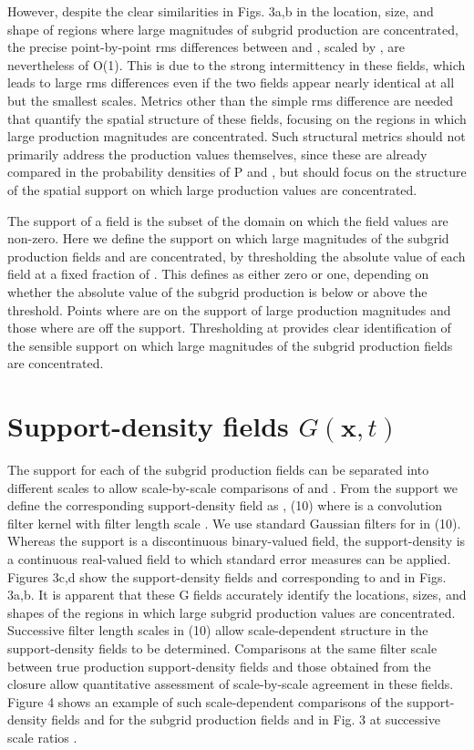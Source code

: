 However, despite the clear similarities in Figs. 3a,b in the location, size, and shape of regions where large magnitudes of subgrid production are concentrated, the precise point-by-point rms differences between   and  , scaled by  , are nevertheless of O(1). This is due to the strong intermittency in these fields, which leads to large rms differences even if the two fields appear nearly identical at all but the smallest scales. Metrics other than the simple rms difference are needed that quantify the spatial structure of these fields, focusing on the regions in which large production magnitudes are concentrated. Such structural metrics should not primarily address the production values themselves, since these are already compared in the probability densities of P and  , but should focus on the structure of the spatial support on which large production values are concentrated.  

The support of a field is the subset of the domain on which the field values are non-zero. Here we define the support on which large magnitudes of the subgrid production fields   and   are concentrated, by thresholding the absolute value of each field at a fixed fraction   of  . This defines   as either zero or one, depending on whether the absolute value of the subgrid production is below or above the threshold. Points where   are on the support of large production magnitudes and those where   are off the support. Thresholding   at   provides clear identification of the sensible support on which large magnitudes of the subgrid production fields are concentrated. 

\section{Support-density fields $G(\mathbf{x},t)$ }

The support for each of the subgrid production fields can be separated into different scales to allow scale-by-scale comparisons of   and  . From the support   we define the corresponding support-density field   as 
  ,                                         (10)
where   is a convolution filter kernel with filter length scale  . We use standard Gaussian filters for   in (10). Whereas the support   is a discontinuous binary-valued field, the support-density   is a continuous real-valued field to which standard error measures can be applied. Figures 3c,d show the support-density fields   and   corresponding to   and   in Figs. 3a,b. It is apparent that these G fields accurately identify the locations, sizes, and shapes of the regions in which large subgrid production values are concentrated. 
Successive filter length scales   in (10) allow scale-dependent structure in the support-density fields to be determined. Comparisons at the same filter scale between true production support-density fields and those obtained from the closure allow quantitative assessment of scale-by-scale agreement in these fields. Figure 4 shows an example of such scale-dependent comparisons of the support-density fields   and   for the subgrid production fields   and   in Fig. 3 at successive scale ratios  . 

